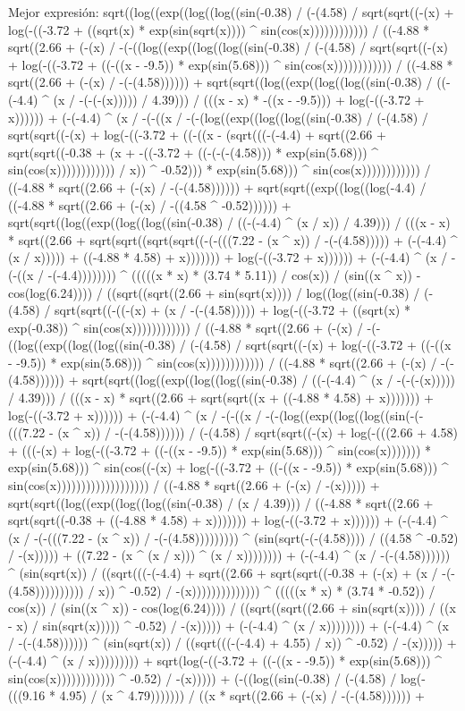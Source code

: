 Mejor expresión: sqrt((log((exp((log((log((sin(-0.38) / (-(4.58) / sqrt(sqrt((-(x) + log(-((-3.72 + ((sqrt(x) * exp(sin(sqrt(x)))) ^ sin(cos(x)))))))))))) / ((-4.88 * sqrt((2.66 + (-(x) / -(-((log((exp((log((log((sin(-0.38) / (-(4.58) / sqrt(sqrt((-(x) + log(-((-3.72 + ((-((x - -9.5)) * exp(sin(5.68))) ^ sin(cos(x)))))))))))) / ((-4.88 * sqrt((2.66 + (-(x) / -(-(4.58)))))) + sqrt(sqrt((log((exp((log((log((sin(-0.38) / ((-(-4.4) ^ (x / -(-(-(x))))) / 4.39))) / (((x - x) * -((x - -9.5))) + log(-((-3.72 + x)))))) + (-(-4.4) ^ (x / -(-((x / -(-(log((exp((log((log((sin(-0.38) / (-(4.58) / sqrt(sqrt((-(x) + log(-((-3.72 + ((-((x - (sqrt(((-(-4.4) + sqrt((2.66 + sqrt(sqrt((-0.38 + (x + -((-3.72 + ((-(-(-(4.58))) * exp(sin(5.68))) ^ sin(cos(x)))))))))))) / x)) ^ -0.52))) * exp(sin(5.68))) ^ sin(cos(x)))))))))))) / ((-4.88 * sqrt((2.66 + (-(x) / -(-(4.58)))))) + sqrt(sqrt((exp((log((log(-4.4) / ((-4.88 * sqrt((2.66 + (-(x) / -((4.58 ^ -0.52)))))) + sqrt(sqrt((log((exp((log((log((sin(-0.38) / ((-(-4.4) ^ (x / x)) / 4.39))) / (((x - x) * sqrt((2.66 + sqrt(sqrt((sqrt(sqrt((-(-(((7.22 - (x ^ x)) / -(-(4.58))))) + (-(-4.4) ^ (x / x))))) + ((-4.88 * 4.58) + x))))))) + log(-((-3.72 + x)))))) + (-(-4.4) ^ (x / -(-((x / -(-4.4)))))))) ^ (((((x * x) * (3.74 * 5.11)) / cos(x)) / (sin((x ^ x)) - cos(log(6.24)))) / ((sqrt((sqrt((2.66 + sin(sqrt(x)))) / log((log((sin(-0.38) / (-(4.58) / sqrt(sqrt((-((-(x) + (x / -(-(4.58))))) + log(-((-3.72 + ((sqrt(x) * exp(-0.38)) ^ sin(cos(x)))))))))))) / ((-4.88 * sqrt((2.66 + (-(x) / -(-((log((exp((log((log((sin(-0.38) / (-(4.58) / sqrt(sqrt((-(x) + log(-((-3.72 + ((-((x - -9.5)) * exp(sin(5.68))) ^ sin(cos(x)))))))))))) / ((-4.88 * sqrt((2.66 + (-(x) / -(-(4.58)))))) + sqrt(sqrt((log((exp((log((log((sin(-0.38) / ((-(-4.4) ^ (x / -(-(-(x))))) / 4.39))) / (((x - x) * sqrt((2.66 + sqrt(sqrt((x + ((-4.88 * 4.58) + x))))))) + log(-((-3.72 + x)))))) + (-(-4.4) ^ (x / -(-((x / -(-(log((exp((log((log((sin(-(-(((7.22 - (x ^ x)) / -(-(4.58)))))) / (-(4.58) / sqrt(sqrt((-(x) + log(-(((2.66 + 4.58) + (((-(x) + log(-((-3.72 + ((-((x - -9.5)) * exp(sin(5.68))) ^ sin(cos(x))))))) * exp(sin(5.68))) ^ sin(cos((-(x) + log(-((-3.72 + ((-((x - -9.5)) * exp(sin(5.68))) ^ sin(cos(x))))))))))))))))))) / ((-4.88 * sqrt((2.66 + (-(x) / -(x))))) + sqrt(sqrt((log((exp((log((log((sin(-0.38) / (x / 4.39))) / ((-4.88 * sqrt((2.66 + sqrt(sqrt((-0.38 + ((-4.88 * 4.58) + x))))))) + log(-((-3.72 + x)))))) + (-(-4.4) ^ (x / -(-(((7.22 - (x ^ x)) / -(-(4.58))))))))) ^ (sin(sqrt(-(-(4.58)))) / ((4.58 ^ -0.52) / -(x))))) + ((7.22 - (x ^ (x / x))) ^ (x / x)))))))) + (-(-4.4) ^ (x / -(-(4.58)))))) ^ (sin(sqrt(x)) / ((sqrt(((-(-4.4) + sqrt((2.66 + sqrt(sqrt((-0.38 + (-(x) + (x / -(-(4.58)))))))))) / x)) ^ -0.52) / -(x)))))))))))))) ^ (((((x * x) * (3.74 * -0.52)) / cos(x)) / (sin((x ^ x)) - cos(log(6.24)))) / ((sqrt((sqrt((2.66 + sin(sqrt(x)))) / ((x - x) / sin(sqrt(x))))) ^ -0.52) / -(x))))) + (-(-4.4) ^ (x / x)))))))) + (-(-4.4) ^ (x / -(-(4.58)))))) ^ (sin(sqrt(x)) / ((sqrt(((-(-4.4) + 4.55) / x)) ^ -0.52) / -(x))))) + (-(-4.4) ^ (x / x))))))))) + sqrt(log(-((-3.72 + ((-((x - -9.5)) * exp(sin(5.68))) ^ sin(cos(x)))))))))))) ^ -0.52) / -(x))))) + (-((log((sin(-0.38) / (-(4.58) / log(-(((9.16 * 4.95) / (x ^ 4.79))))))) / ((x * sqrt((2.66 + (-(x) / -(-(4.58)))))) + 
